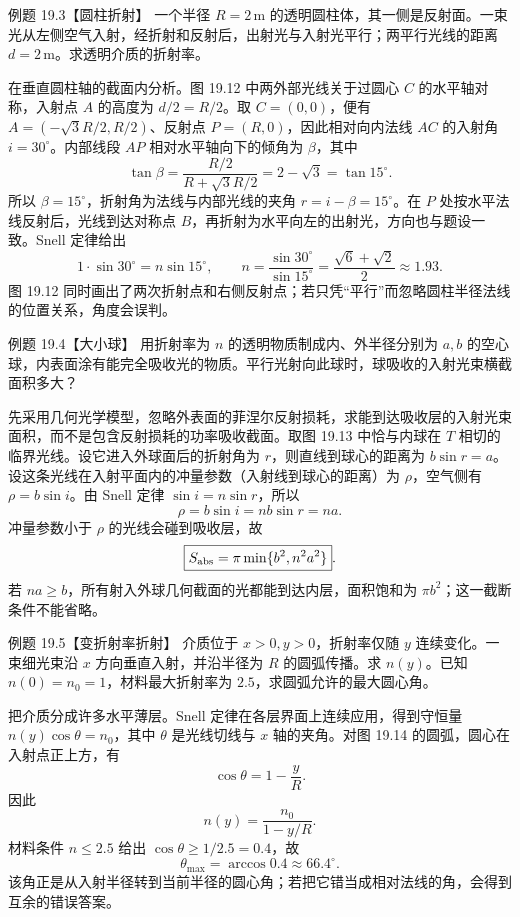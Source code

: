 \begin{origexamplebox}{例题 19.3【圆柱折射】}
一个半径 $R=2\,\mathrm m$ 的透明圆柱体，其一侧是反射面。一束光从左侧空气入射，经折射和反射后，出射光与入射光平行；两平行光线的距离 $d=2\,\mathrm m$。求透明介质的折射率。
\end{origexamplebox}
\begin{xesolution}
在垂直圆柱轴的截面内分析。图 19.12 中两外部光线关于过圆心 $C$ 的水平轴对称，入射点 $A$ 的高度为 $d/2=R/2$。取 $C=(0,0)$，便有 $A=(-\sqrt3R/2,R/2)$、反射点 $P=(R,0)$，因此相对向内法线 $AC$ 的入射角 $i=30^\circ$。内部线段 $AP$ 相对水平轴向下的倾角为 $\beta$，其中
\[
 \tan\beta=\frac{R/2}{R+\sqrt3R/2}=2-\sqrt3=\tan15^\circ.
\]
所以 $\beta=15^\circ$，折射角为法线与内部光线的夹角 $r=i-\beta=15^\circ$。在 $P$ 处按水平法线反射后，光线到达对称点 $B$，再折射为水平向左的出射光，方向也与题设一致。Snell 定律给出
\[
 1\cdot\sin30^\circ=n\sin15^\circ,\qquad
 \boxed{n=\frac{\sin30^\circ}{\sin15^\circ}=\frac{\sqrt6+\sqrt2}{2}\approx1.93}.
\]
图 19.12 同时画出了两次折射点和右侧反射点；若只凭“平行”而忽略圆柱半径法线的位置关系，角度会误判。
\end{xesolution}

\ShellAndGradientDiagram

\begin{origexamplebox}{例题 19.4【大小球】}
用折射率为 $n$ 的透明物质制成内、外半径分别为 $a,b$ 的空心球，内表面涂有能完全吸收光的物质。平行光射向此球时，球吸收的入射光束横截面积多大？
\end{origexamplebox}
\begin{xesolution}
先采用几何光学模型，忽略外表面的菲涅尔反射损耗，求能到达吸收层的入射光束面积，而不是包含反射损耗的功率吸收截面。取图 19.13 中恰与内球在 $T$ 相切的临界光线。设它进入外球面后的折射角为 $r$，则直线到球心的距离为 $b\sin r=a$。设这条光线在入射平面内的冲量参数（入射线到球心的距离）为 $\rho$，空气侧有 $\rho=b\sin i$。由 Snell 定律 $\sin i=n\sin r$，所以
\[
 \rho=b\sin i=nb\sin r=na.
\]
冲量参数小于 $\rho$ 的光线会碰到吸收层，故
\[
 \boxed{S_{\rm abs}=\pi\min\{b^2,n^2a^2\}}.
\]
若 $na\ge b$，所有射入外球几何截面的光都能到达内层，面积饱和为 $\pi b^2$；这一截断条件不能省略。
\end{xesolution}

\begin{origexamplebox}{例题 19.5【变折射率折射】}
介质位于 $x>0,y>0$，折射率仅随 $y$ 连续变化。一束细光束沿 $x$ 方向垂直入射，并沿半径为 $R$ 的圆弧传播。求 $n(y)$。已知 $n(0)=n_0=1$，材料最大折射率为 $2.5$，求圆弧允许的最大圆心角。
\end{origexamplebox}
\begin{xesolution}
把介质分成许多水平薄层。Snell 定律在各层界面上连续应用，得到守恒量 $n(y)\cos\theta=n_0$，其中 $\theta$ 是光线切线与 $x$ 轴的夹角。对图 19.14 的圆弧，圆心在入射点正上方，有
\[
 \cos\theta=1-\frac{y}{R}.
\]
因此
\[
 \boxed{n(y)=\frac{n_0}{1-y/R}}.
\]
材料条件 $n\le2.5$ 给出 $\cos\theta\ge1/2.5=0.4$，故
\[
 \boxed{\theta_{\max}=\arccos0.4\approx66.4^\circ}.
\]
该角正是从入射半径转到当前半径的圆心角；若把它错当成相对法线的角，会得到互余的错误答案。
\end{xesolution}


